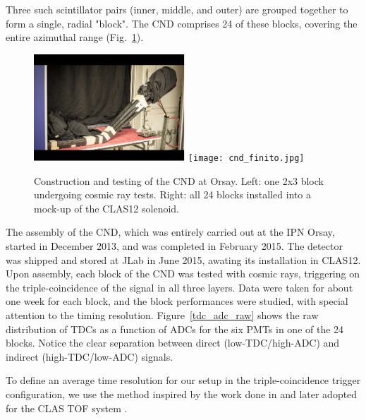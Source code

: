 Three such scintillator pairs (inner, middle, and outer) are grouped together to form a single, radial "block".  The CND comprises 24 of these blocks, covering the entire azimuthal range (Fig.~\ref{CND_Orsay}).

\begin{figure}
\begin{center}
    \includegraphics[height=40mm]{block_tested_2.pdf}
    \texttt{[image: cnd\_finito.jpg]}
  \caption{Construction and testing of the CND at Orsay. Left: one 2x3 block undergoing cosmic ray tests.  Right: all 24 blocks installed into a mock-up of the CLAS12 solenoid.}
  \label{CND_Orsay}
\end{center}
\end{figure}
The assembly of the CND, which was entirely carried out at the IPN Orsay, started in December 2013, and was completed in February 2015. The detector was shipped and stored at JLab in June 2015, awating its installation in CLAS12. Upon assembly, each block of the CND was tested with cosmic rays, triggering on the triple-coincidence of the signal in all three layers. Data were taken for about one week for each block, and the block performances were studied, with special attention to the timing resolution. 
Figure~\ref{tdc_adc_raw} shows the raw distribution of TDCs as a function of ADCs for the six PMTs in one of the 24 blocks. Notice the clear separation between direct (low-TDC/high-ADC) and indirect (high-TDC/low-ADC) signals. 

To define an average time resolution for our setup in the triple-coincidence trigger configuration, we use the method inspired by the work done in \cite{giles} and later adopted for the CLAS TOF system \cite{elton_paper}. 


